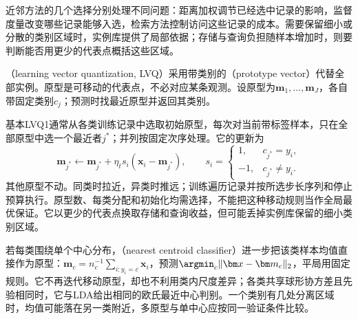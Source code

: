 近邻方法的几个选择分别处理不同问题：距离加权调节已经选中记录的影响，监督度量改变哪些记录能够入选，检索方法控制访问这些记录的成本。需要保留细小或分散的类别区域时，实例库提供了局部依据；存储与查询负担随样本增加时，则要判断能否用更少的代表点概括这些区域。

（learning vector quantization, LVQ）采用带类别的（prototype vector）代替全部实例。原型是可移动的代表点，不必对应某条观测。设原型为$\bm m_1,\ldots,\bm m_J$，各自带固定类别$c_j$；预测时找最近原型并返回其类别。

基本LVQ1通常从各类训练记录中选取初始原型，每次对当前带标签样本，只在全部原型中选一个最近者$j^\ast$；并列按固定次序处理。它的更新为
\[
  \bm m_{j^\ast}\leftarrow\bm m_{j^\ast}
    +\eta_t s_i(\bm x_i-\bm m_{j^\ast}),\qquad
  s_i=\begin{cases}1,&c_{j^\ast}=y_i,\\-1,&c_{j^\ast}\ne y_i.\end{cases}
\]
其他原型不动。同类时拉近，异类时推远；训练遍历记录并按所选步长序列和停止预算执行。原型数、每类分配和初始化均需选择，不能把这种移动规则当作全局最优保证。它以更少的代表点换取存储和查询收益，但可能丢掉实例库保留的细小类别区域。

若每类围绕单个中心分布，（nearest centroid classifier）进一步把该类样本均值直接作为原型：$\bm m_c=n_c^{-1}\sum_{i:y_i=c}\bm x_i$，预测$\argmin_c\|\bm x-\bm m_c\|_2$，平局用固定规则。它不再迭代移动原型，却也不利用类内尺度差异；各类共享球形协方差且先验相同时，它与LDA给出相同的欧氏最近中心判别。一个类别有几处分离区域时，均值可能落在另一类附近，多原型与单中心应按同一验证条件比较。
